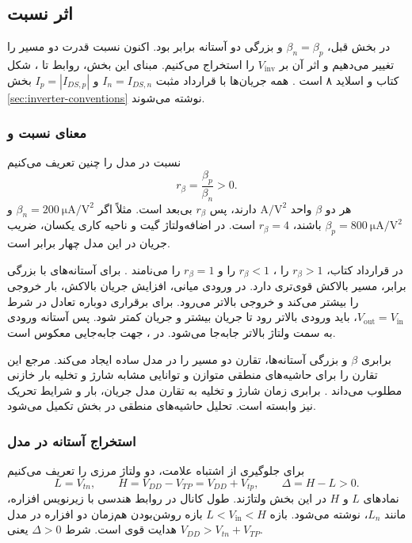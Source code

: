 \clearpage
\subsection{اثر نسبت }
\label{sec:beta-ratio}
در بخش قبل، \(\beta_n=\beta_p\) و بزرگی دو آستانه برابر بود.
اکنون نسبت قدرت دو مسیر را تغییر می‌دهیم و اثر آن بر
\(V_{\mathrm{inv}}\) را استخراج می‌کنیم. مبنای این بخش، روابط
 تا ، شکل  کتاب و
اسلاید ۸ است \cite[بخش ، صفحات ۹۰ و ابتدای ۹۱]{weste}
\cite[اسلاید ۸]{dcslides}. همه جریان‌ها با قرارداد مثبت
\(I_n=I_{DS,n}\) و \(I_p=|I_{DS,p}|\) بخش
\ref{sec:inverter-conventions} نوشته می‌شوند.

\subsubsection{معنای نسبت و }
\label{sec:beta-skew-definition}
نسبت  در مدل  را چنین تعریف می‌کنیم
\begin{equation}
 \boxed{r_\beta=\frac{\beta_p}{\beta_n}}>0.
 \label{eq:beta-ratio-definition}
\end{equation}
هر دو \(\beta\) واحد \(\unit{\ampere\per\volt\squared}\) دارند،
پس \(r_\beta\) بی‌بعد است. مثلاً اگر
\(\beta_n=\qty{200}{\micro\ampere\per\volt\squared}\) و
\(\beta_p=\qty{800}{\micro\ampere\per\volt\squared}\) باشند،
\(r_\beta=4\) است. در اضافه‌ولتاژ گیت و ناحیه کاری یکسان،
ضریب جریان  در این مدل چهار برابر است.

در قرارداد کتاب، \(r_\beta>1\) را ،
\(r_\beta<1\) را  و \(r_\beta=1\) را
 می‌نامند \cite[صفحه ۹۰]{weste}.
برای آستانه‌های با بزرگی برابر،  مسیر بالاکش
قوی‌تری دارد. در ورودی میانی، افزایش جریان بالاکش، بار خروجی
را بیشتر می‌کند و خروجی بالاتر می‌رود. برای برقراری دوباره تعادل
در شرط \(V_{\mathrm{out}}=V_{\mathrm{in}}\)، باید ورودی بالاتر
رود تا جریان  بیشتر و جریان  کمتر شود.
پس آستانه ورودی به سمت ولتاژ بالاتر جابه‌جا می‌شود.
در ، جهت جابه‌جایی معکوس است.

برابری \(\beta\) و بزرگی آستانه‌ها، تقارن دو مسیر را در مدل
ساده ایجاد می‌کند. مرجع این تقارن را برای حاشیه‌های منطقی
متوازن و توانایی مشابه شارژ و تخلیه بار خازنی مطلوب می‌داند
\cite[آغاز بخش ]{weste}.
برابری زمان شارژ و تخلیه به تقارن مدل جریان، بار و شرایط تحریک
نیز وابسته است. تحلیل حاشیه‌های منطقی در بخش 
تکمیل می‌شود.

\subsubsection{استخراج آستانه در مدل }
\label{sec:beta-long-channel}
برای جلوگیری از اشتباه علامت، دو ولتاژ مرزی را تعریف می‌کنیم
\begin{equation}
 L=V_{tn},\qquad H=V_{DD}-V_{TP}=V_{DD}+V_{tp},\qquad
 \Delta=H-L>0.
 \label{eq:beta-window}
\end{equation}
نمادهای \(L\) و \(H\) در این بخش ولتاژند. طول کانال در روابط
هندسی با زیرنویس افزاره، مانند \(L_n\)، نوشته می‌شود.
بازه \(L<V_{\mathrm{in}}<H\) بازه روشن‌بودن هم‌زمان دو
افزاره در مدل هدایت قوی است. شرط \(\Delta>0\) یعنی
\(V_{DD}>V_{tn}+V_{TP}\).

